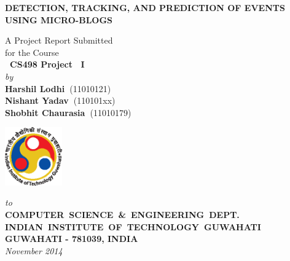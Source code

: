 \documentclass[12pt,a4paper]{report}
\begin{document}

\begin{titlepage}
\enlargethispage{1cm}

\begin{center}


\textbf{\Large DETECTION, TRACKING, AND PREDICTION OF EVENTS USING MICRO-BLOGS}

\vfill

A Project Report Submitted \\
for the Course \\[1.5cm]

{\bf\Large\ CS498 Project ~I }\\[1.5cm]


{\large \emph{by}}\\[5pt]
{\large\bf {Harshil Lodhi~}}{\large (11010121)}\\
{\large\bf {Nishant Yadav~}}{\large (110101xx)}\\
{\large\bf {Shobhit Chaurasia~}}{\large (11010179)}

\vfill
\includegraphics[height=2.5cm]{figures/iitglogo}

\vspace*{0.5cm}

{\em\large to}\\[10pt]
{\bf\large \mbox {COMPUTER SCIENCE \& ENGINEERING DEPT.}} \\[5pt]
{\bf\large \mbox{INDIAN INSTITUTE OF TECHNOLOGY GUWAHATI}}\\[5pt]
{\bf\large GUWAHATI - 781039, INDIA}\\[10pt]
{\it\large November 2014}
\end{center}

\end{titlepage}

\clearpage
\end{document}
